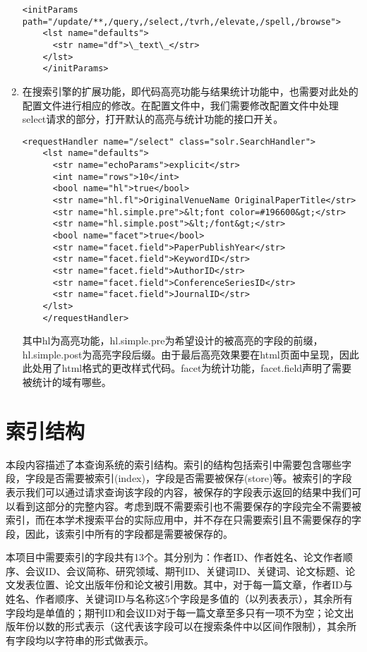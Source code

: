 \begin{enumerate}
    \begin{lstlisting}[caption={solrconfig.xml改动3}, label=ptszi3, escapeinside="", numbers=none]
    <initParams path="/update/**,/query,/select,/tvrh,/elevate,/spell,/browse">
    <lst name="defaults">
      <str name="df">\_text\_</str>
    </lst>
    </initParams>
    \end{lstlisting}
    \item 在搜索引擎的扩展功能，即代码高亮功能与结果统计功能中，也需要对此处的配置文件进行相应的修改。在配置文件中，我们需要修改配置文件中处理select请求的部分，打开默认的高亮与统计功能的接口开关。
    \begin{lstlisting}[caption={solrconfig.xml改动4}, label=ptszi4, escapeinside="", numbers=none]
    <requestHandler name="/select" class="solr.SearchHandler">
    <lst name="defaults">
      <str name="echoParams">explicit</str>
      <int name="rows">10</int>
      <bool name="hl">true</bool>
      <str name="hl.fl">OriginalVenueName OriginalPaperTitle</str>
      <str name="hl.simple.pre">&lt;font color=#196600&gt;</str>
      <str name="hl.simple.post">&lt;/font&gt;</str>
      <bool name="facet">true</bool>
      <str name="facet.field">PaperPublishYear</str>
      <str name="facet.field">KeywordID</str>
      <str name="facet.field">AuthorID</str>
      <str name="facet.field">ConferenceSeriesID</str>
      <str name="facet.field">JournalID</str>
    </lst>
    </requestHandler>
    \end{lstlisting}
    其中hl为高亮功能，hl.simple.pre为希望设计的被高亮的字段的前缀，hl.simple.post为高亮字段后缀。由于最后高亮效果要在html页面中呈现，因此此处用了html格式的更改样式代码。facet为统计功能，facet.field声明了需要被统计的域有哪些。
    \end{enumerate}


\section{索引结构}
    本段内容描述了本查询系统的索引结构。索引的结构包括索引中需要包含哪些字段，字段是否需要被索引(index)，字段是否需要被保存(store)等。被索引的字段表示我们可以通过请求查询该字段的内容，被保存的字段表示返回的结果中我们可以看到这部分的完整内容。考虑到既不需要索引也不需要保存的字段完全不需要被索引，而在本学术搜索平台的实际应用中，并不存在只需要索引且不需要保存的字段，因此，该索引中所有的字段都是需要被保存的。

    本项目中需要索引的字段共有13个。其分别为：作者ID、作者姓名、论文作者顺序、会议ID、会议简称、研究领域、期刊ID、关键词ID、关键词、论文标题、论文发表位置、论文出版年份和论文被引用数。其中，对于每一篇文章，作者ID与姓名、作者顺序、关键词ID与名称这5个字段是多值的（以列表表示），其余所有字段均是单值的；期刊ID和会议ID对于每一篇文章至多只有一项不为空；论文出版年份以数的形式表示（这代表该字段可以在搜索条件中以区间作限制），其余所有字段均以字符串的形式做表示。

